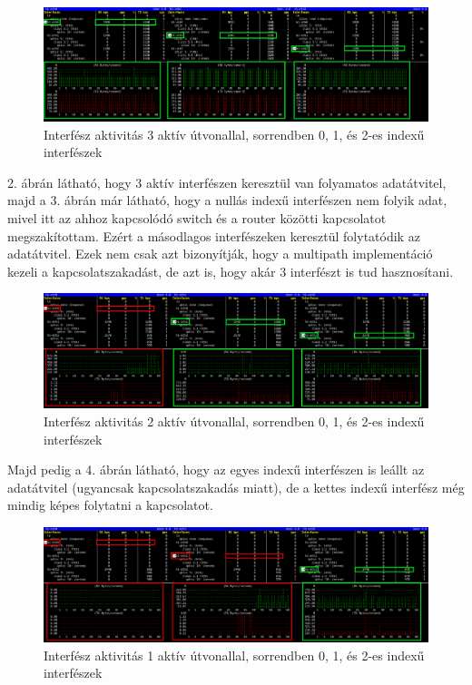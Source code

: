 \documentclass[a4paper,oneside]{article}
\begin{document}
\begin{figure}[h]
  \centering
    \hspace*{-1.5cm}%
    \includegraphics[width=18cm]{bmon11}
\caption{Interfész aktivitás 3 aktív útvonallal, sorrendben 0, 1, és 2-es indexű interfészek}
\end{figure}

2. ábrán látható, hogy 3 aktív interfészen keresztül van folyamatos adatátvitel, majd a 3. ábrán 
már látható, hogy a nullás indexű interfészen nem folyik adat, mivel itt az ahhoz kapcsolódó switch és a router közötti kapcsolatot megszakítottam.
Ezért a másodlagos interfészeken keresztül folytatódik az adatátvitel. Ezek nem csak azt bizonyítják, hogy a multipath 
implementáció kezeli a kapcsolatszakadást, de azt is, hogy akár 3 interfészt is tud hasznosítani.


\begin{figure}[h]
  \centering
    \hspace*{-1.5cm}%
    \includegraphics[width=18cm]{bmon22}
\caption{Interfész aktivitás 2 aktív útvonallal, sorrendben 0, 1, és 2-es indexű interfészek}
\end{figure}

Majd pedig a 4. ábrán látható, hogy az egyes indexű interfészen is leállt az adatátvitel (ugyancsak 
kapcsolatszakadás miatt), de a kettes indexű interfész még mindig képes folytatni a kapcsolatot.

\begin{figure}[h]
  \centering
    \hspace*{-1.5cm}%
    \includegraphics[width=18cm]{bmon33}
\caption{Interfész aktivitás 1 aktív útvonallal, sorrendben 0, 1, és 2-es indexű interfészek}
\end{figure}
\end{document}
